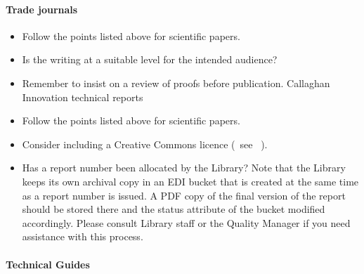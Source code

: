 \paragraph{Trade journals}
\begin{itemize}
\item  Follow the points listed above for scientific papers.
\item  Is the writing at a suitable level for the intended audience?
\item  Remember to insist on a review of proofs before publication.
 Callaghan Innovation technical reports
\item  Follow the points listed above for scientific papers.
\item  Consider including a Creative Commons licence (~see \cite[\S\ref*{GRP-s_copyright}]{MSL_Reporting_Guidelines}~).
\item  Has a report number been allocated by the Library? Note that the Library keeps its own archival copy in an EDI bucket that is created at the same time as a report number is issued. A PDF copy of the final version of the report should be stored there and the status attribute of the bucket modified accordingly. Please consult Library staff or the Quality Manager if you need assistance with this process.
\end{itemize} 

\paragraph{Technical Guides}

